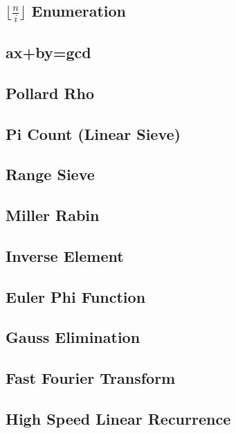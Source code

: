 \documentclass[a4paper,10pt,twocolumn,oneside]{article}
\begin{document}
\subsection{$\lfloor \frac{n}{i} \rfloor$ Enumeration}

\subsection{ax+by=gcd}

\subsection{Pollard Rho}

\subsection{Pi Count (Linear Sieve)}

\subsection{Range Sieve}

\subsection{Miller Rabin}

\subsection{Inverse Element}

\subsection{Euler Phi Function}

\subsection{Gauss Elimination}

\subsection{Fast Fourier Transform}

\subsection{High Speed Linear Recurrence}

\end{document}
